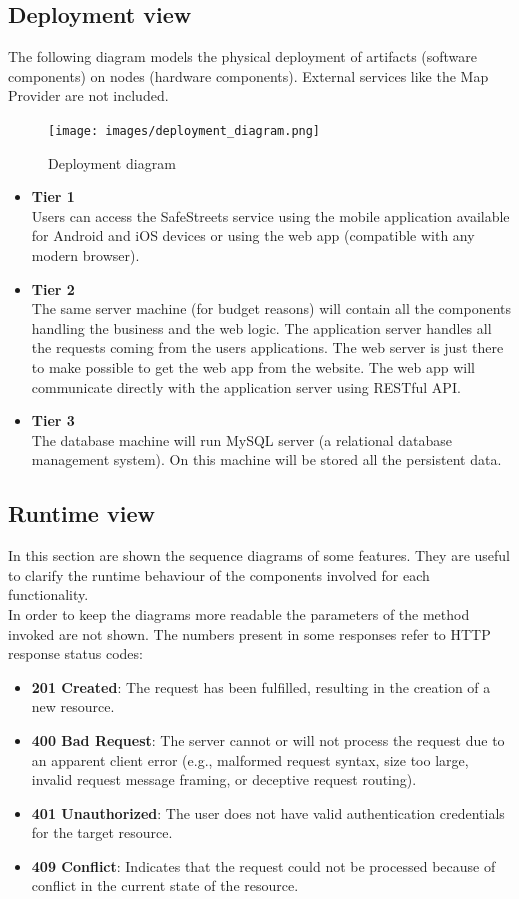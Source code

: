 \documentclass{article}
\begin{document}
\newpage

\subsection{Deployment view}
\label{sec:Deployment}
The following diagram models the physical deployment of artifacts (software components) on nodes (hardware components).
External services like the Map Provider are not included.
\begin{figure}[h!]
\centering
	\texttt{[image: images/deployment\_diagram.png]}
	\caption{Deployment diagram}
	\label{fig:deployment-diagram}
\end{figure}

	
\begin{itemize}
	\item \textbf{Tier 1} \\
		Users can access the SafeStreets service using the mobile application available for Android and iOS devices or using the web app (compatible with any modern browser).
	\item \textbf{Tier 2} \\ 
		The same server machine (for budget reasons)  will contain all the components handling the business and the web logic. The application server handles all the requests coming from the users applications. The web server is just there to make possible to get the web app from the website. The web app will communicate directly with the application server using RESTful API.
	\item \textbf{Tier 3} \\
		The database machine will run MySQL server (a relational database management system). On this machine will be stored all the persistent data.
\end{itemize}

\newpage
\subsection{Runtime view}
\label{sec:Runtime}
 In this section are shown the sequence diagrams of some features. They are useful to clarify the runtime behaviour of the components involved for each functionality.\\
 In order to keep the diagrams more readable the parameters of the method invoked are not shown.
The numbers present in some responses refer to HTTP response status codes:
\begin{itemize}
	\item \textbf{201 Created}: The request has been fulfilled, resulting in the creation of a new resource.
	\item \textbf{400 Bad Request}: The server cannot or will not process the request due to an apparent client error (e.g., malformed request syntax, size too large, invalid request message framing, or deceptive request routing).
	\item \textbf{401 Unauthorized}: The user does not have valid authentication credentials for the target resource.
	\item \textbf{409 Conflict}: Indicates that the request could not be processed because of conflict in the current state of the resource. 
\end{itemize}
\end{document}
